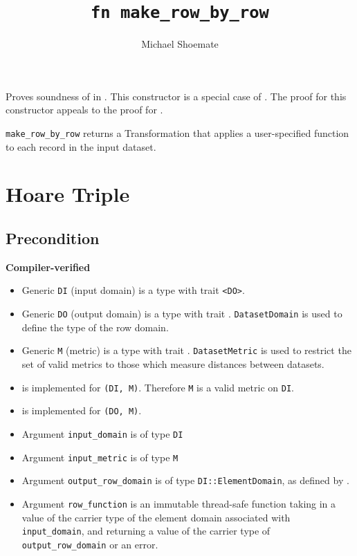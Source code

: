 \documentclass{article}
\title{\texttt{fn make\_row\_by\_row}}
\author{Michael Shoemate}
\date{}
\begin{document}
 
 
\maketitle 
 
Proves soundness of  in . 
This constructor is a special case of . 
The proof for this constructor appeals to the proof for . 
 
\texttt{make\_row\_by\_row} returns a Transformation that applies a user-specified function to each record in the input dataset. 
 
\section{Hoare Triple} 
\subsection*{Precondition} 
\textbf{Compiler-verified} 
\begin{itemize} 
    \item Generic \texttt{DI} (input domain) is a type with trait \texttt{<DO>}.  
    \item Generic \texttt{DO} (output domain) is a type with trait .  
        \texttt{DatasetDomain} is used to define the type of the row domain. 
    \item Generic \texttt{M} (metric) is a type with trait .  
        \texttt{DatasetMetric} is used to restrict the set of valid metrics to those which measure distances between datasets. 
    \item {} is implemented for \texttt{(DI, M)}. Therefore \texttt{M} is a valid metric on \texttt{DI}. 
    \item {} is implemented for \texttt{(DO, M)}. 
    \item Argument \texttt{input\_domain} is of type \texttt{DI} 
    \item Argument \texttt{input\_metric} is of type \texttt{M} 
    \item Argument \texttt{output\_row\_domain} is of type \texttt{DI::ElementDomain}, as defined by . 
    \item Argument \texttt{row\_function} is an immutable thread-safe function taking in a value of the carrier type of the element domain associated with \texttt{input\_domain},  
    and returning a value of the carrier type of \texttt{output\_row\_domain} or an error. 
\end{itemize} 
 
\end{document}
